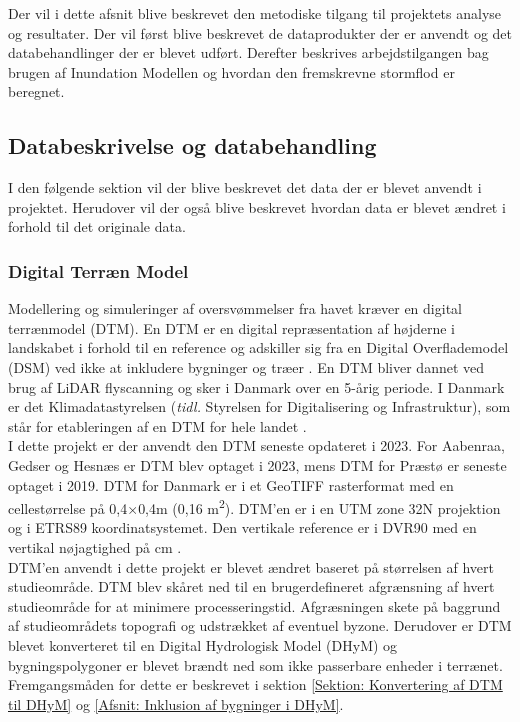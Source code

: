 Der vil i dette afsnit blive beskrevet den metodiske tilgang til projektets analyse og resultater. Der vil først blive beskrevet de dataprodukter der er anvendt og det databehandlinger der er blevet udført. Derefter beskrives arbejdstilgangen bag brugen af Inundation Modellen og hvordan den fremskrevne stormflod er beregnet. \\

\subsection{Databeskrivelse og databehandling} \label{Sektion: Databeskrivelse}


I den følgende sektion vil der blive beskrevet det data der er blevet anvendt i projektet. Herudover vil der også blive beskrevet hvordan data er blevet ændret i forhold til det originale data. 

\subsubsection{Digital Terræn Model} \label{Afsnit: Digital Terræn Model}
Modellering og simuleringer af oversvømmelser fra havet kræver en digital terrænmodel (DTM). En DTM er en digital repræsentation af højderne i landskabet i forhold til en reference og adskiller sig fra en Digital Overflademodel (DSM) ved ikke at inkludere bygninger og træer \citep{sdfe_dhm_2020}. En DTM bliver dannet ved brug af LiDAR flyscanning og sker i Danmark over en 5-årig periode. 
I Danmark er det Klimadatastyrelsen (\textit{tidl.} Styrelsen for Digitalisering og Infrastruktur), som står for etableringen af en DTM for hele landet \citep{sdfe_dhm_2020}. \\

I dette projekt er der anvendt den DTM seneste opdateret i 2023. For Aabenraa, Gedser og Hesnæs er DTM blev optaget i 2023, mens DTM for Præstø er seneste optaget i 2019. DTM for Danmark er i et GeoTIFF rasterformat med en cellestørrelse på 0,4$\times$0,4m (0,16 m\textsuperscript{2}). DTM'en er i en UTM zone 32N projektion og i ETRS89 koordinatsystemet. Den vertikale reference er i DVR90 med en vertikal nøjagtighed på  cm \citep{sdfe_dhm_2020}. \\
DTM'en anvendt i dette projekt er blevet ændret baseret på størrelsen af hvert studieområde. DTM blev skåret ned til en brugerdefineret afgrænsning af hvert studieområde for at minimere processeringstid. Afgræsningen skete på baggrund af studieområdets topografi og udstrækket af eventuel byzone. Derudover er DTM blevet konverteret til en Digital Hydrologisk Model (DHyM) og bygningspolygoner er blevet brændt ned som ikke passerbare enheder i terrænet. Fremgangsmåden for dette er beskrevet i sektion \ref{Sektion: Konvertering af DTM til DHyM} og \ref{Afsnit: Inklusion af bygninger i DHyM}.  


